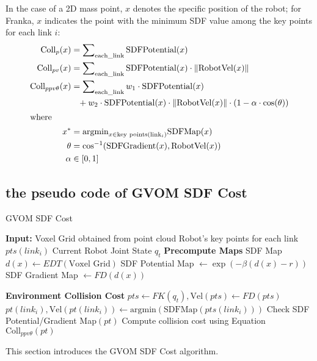 \documentclass{article}
\begin{document}
In the case of a 2D mass point, $x$ denotes the specific position of the robot; for Franka, $x$ indicates the point with the minimum SDF value among the key points for each link $i$:
\begin{align*}
	\text{Coll}_{p}(x)  &= \sum\nolimits_{\text{each\_link}} {\text{SDFPotential}(x)} \\
	\text{Coll}_{pv}(x) &= \sum\nolimits_{\text{each\_link}} {\text{SDFPotential}(x)}  \cdot \left\| \text{RobotVel}(x)\right\| \\
	\text{Coll}_{ppv\theta}(x) &= \sum\nolimits_{\text{each\_link}} w_1 \cdot \text{SDFPotential}(x) \\
	&\phantom{=} + w_2 \cdot \text{SDFPotential}(x) \cdot \left\| \text{RobotVel}(x) \right\| \cdot (1 - \alpha \cdot \cos(\theta))\\
   \intertext{where}
	x^* &= \text{argmin}_{x \in \text{key points}(\text{link}_i)} \text{SDFMap}(x) \\ 
	\theta &= \cos^{-1}(\text{SDFGradient}(x), \text{RobotVel}(x)) \\
	\alpha &\in [0,1]
\end{align*}


\subsection{the pseudo code of GVOM SDF Cost }

\begin{algorithm}
	\caption{GVOM SDF Cost}
	\begin{algorithmic}[1]
		\Statex \textbf{Input:}
		\Statex \quad Voxel Grid obtained from point cloud
		\Statex \quad Robot's key points for each link $pts(link_i)$
		\Statex \quad Current Robot Joint State $q_t$
		\Statex \textbf{Precompute Maps}
			\State \quad SDF Map  $ d(x) \leftarrow EDT(\text{Voxel Grid})$
			\State \quad SDF Potential Map $\leftarrow \exp(-\beta(d(x) - r)) $ 
			\State \quad SDF Gradient Map $\leftarrow FD(d(x))$ 

		\Statex \textbf{Environment Collision Cost}
			\State \quad $pts \leftarrow FK(q_t) , \text{Vel}(pts) \leftarrow FD(pts)$
			\State \quad $pt(link_i),  \text{Vel}(pt(link_i)) \leftarrow \text{argmin}(\text{SDFMap}(pts(link_i))) $
			\State \quad Check SDF Potential/Gradient Map$(pt)$ 
			\State \quad Compute collision cost using Equation $\text{Coll}_{ppv\theta}(pt)$
	\end{algorithmic}
\end{algorithm}


This section introduces the GVOM SDF Cost algorithm.
\end{document}
